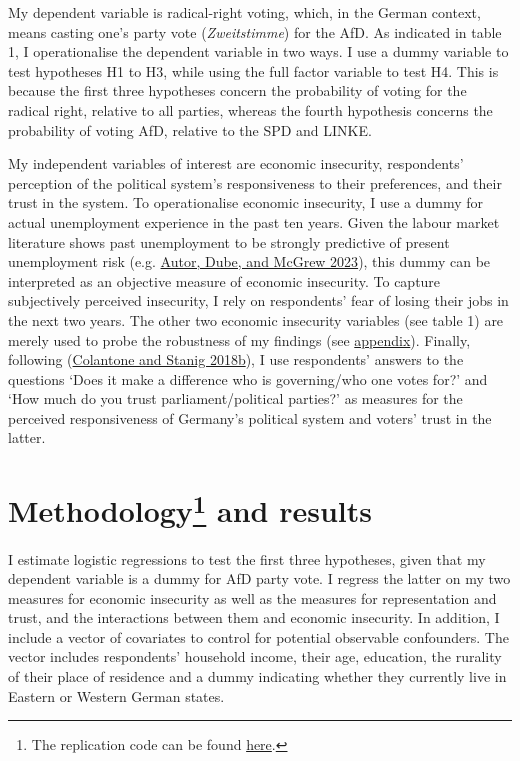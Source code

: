\documentclass[
]{article}
\begin{document}
My dependent variable is radical-right voting, which, in the German
context, means casting one's party vote (\emph{Zweitstimme}) for the
AfD. As indicated in table 1, I operationalise the dependent variable in
two ways. I use a dummy variable to test hypotheses H1 to H3, while
using the full factor variable to test H4. This is because the first
three hypotheses concern the probability of voting for the radical
right, relative to all parties, whereas the fourth hypothesis concerns
the probability of voting AfD, relative to the SPD and LINKE.

My independent variables of interest are economic insecurity,
respondents' perception of the political system's responsiveness to
their preferences, and their trust in the system. To operationalise
economic insecurity, I use a dummy for actual unemployment experience in
the past ten years. Given the labour market literature shows past
unemployment to be strongly predictive of present unemployment risk
(e.g. \protect\hyperlink{ref-autor_unexpected_2023}{Autor, Dube, and
McGrew 2023}), this dummy can be interpreted as an objective measure of
economic insecurity. To capture subjectively perceived insecurity, I
rely on respondents' fear of losing their jobs in the next two years.
The other two economic insecurity variables (see table 1) are merely
used to probe the robustness of my findings (see
\protect\hyperlink{appendix}{appendix}). Finally, following
(\protect\hyperlink{ref-colantone_global_2018}{Colantone and Stanig
2018b}), I use respondents' answers to the questions `Does it make a
difference who is governing/who one votes for?' and `How much do you
trust parliament/political parties?' as measures for the perceived
responsiveness of Germany's political system and voters' trust in the
latter.

\hypertarget{methodology-and-results}{%
\section[Methodology and results]{\texorpdfstring{Methodology\footnote{The
  replication code can be found
  \href{https://github.com/jacob-edenhofer/Analysing_Vote_Choice_Data_TT2023}{here}.}
and results}{Methodology and results}}\label{methodology-and-results}}

I estimate logistic regressions to test the first three hypotheses,
given that my dependent variable is a dummy for AfD party vote. I
regress the latter on my two measures for economic insecurity as well as
the measures for representation and trust, and the interactions between
them and economic insecurity. In addition, I include a vector of
covariates to control for potential observable confounders. The vector
includes respondents' household income, their age, education, the
rurality of their place of residence and a dummy indicating whether they
currently live in Eastern or Western German states.
\end{document}

